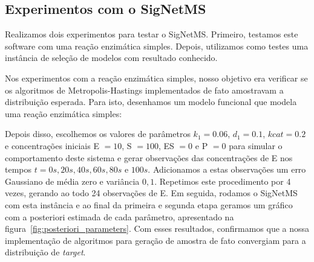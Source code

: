 \documentclass[12pt]{article}
\begin{document}
\subsection{Experimentos com o SigNetMS}\label{experimentos}
Realizamos dois experimentos para testar o SigNetMS. Primeiro, testamos
este software com uma reação enzimática simples. Depois, utilizamos como
testes uma instância de seleção de modelos com resultado conhecido.

Nos experimentos com a reação enzimática simples, nosso objetivo era
verificar se os algoritmos de Metropolis-Hastings implementados de fato
amostravam a distribuição esperada. Para isto, desenhamos um modelo 
funcional que modela uma reação enzimática simples:
\begin{center}
\end{center}
Depois disso, escolhemos os valores de parâmetros $k_1 = 0.06$, 
$d_1 = 0.1$, $kcat = 0.2$ e concentrações iniciais E $= 10$, S $= 100$, 
ES $= 0$ e P $= 0$ para simular o comportamento deste sistema e gerar 
observações das concentrações de E nos tempos $t = 0s, 20s, 40s, 60s, 
80s$ e $100s$. Adicionamos a estas observações um erro Gaussiano de 
média zero e variância $0,1$. Repetimos este procedimento por 4 vezes, 
gerando ao todo 24 observações de E. Em seguida, rodamos o SigNetMS
com esta instância e ao final da primeira e segunda etapa geramos um 
gráfico com a posteriori estimada de cada parâmetro, apresentado na
figura~\ref{fig:posteriori_parameters}. Com esses resultados, 
confirmamos que a nossa implementação de algoritmos para geração de 
amostra de fato convergiam para a distribuição de {\em target}.
\end{document}
